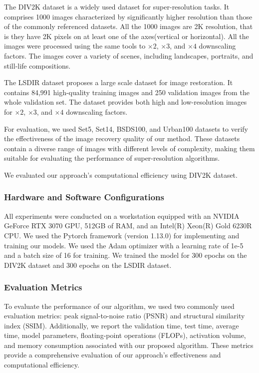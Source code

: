 \documentclass[10pt,twocolumn,letterpaper]{article}
\begin{document}
The DIV2K dataset is a widely used dataset for super-resolution tasks. It comprises 1000 images characterized by significantly higher resolution than those of the commonly referenced datasets. All the 1000 images are 2K resolution, that is they have 2K pixels on at least one of the axes(vertical or horizontal). All the images were processed using the same tools to $\times2$, $\times3$, and $\times4$ downscaling factors. The images cover a variety of scenes, including landscapes, portraits, and still-life compositions.

The LSDIR dataset proposes a large scale dataset for image restoration. It contains 84,991 high-quality training images and 250 validation images from the whole validation set. The dataset provides both high and low-resolution images for $\times2$, $\times3$, and $\times4$ downscaling factors.

For evaluation, we used Set5, Set14, BSDS100, and Urban100 datasets to verify the effectiveness of the image recovery quality of our method. These datasets contain a diverse range of images with different levels of complexity, making them suitable for evaluating the performance of super-resolution algorithms.

We evaluated our approach's computational efficiency using DIV2K dataset.


\subsubsection{Hardware and Software Configurations}
All experiments were conducted on a workstation equipped with an NVIDIA GeForce RTX 3070 GPU, 512GB of RAM, and an Intel(R) Xeon(R) Gold 6230R CPU. We used the Pytorch framework (version 1.13.0) for implementing and training our models. We used the Adam optimizer with a learning rate of 1e-5 and a batch size of 16 for training. We trained the model for 300 epochs on the DIV2K dataset and 300 epochs on the LSDIR dataset.

\subsubsection{Evaluation Metrics}
To evaluate the performance of our algorithm, we used two commonly used evaluation metrics: peak signal-to-noise ratio (PSNR) and structural similarity index (SSIM). Additionally, we report the validation time, test time, average time, model parameters, floating-point operations (FLOPs), activation volume, and memory consumption associated with our proposed algorithm. These metrics provide a comprehensive evaluation of our approach's effectiveness and computational efficiency.
\begin{table}[t]
  \centering
  \caption{Results of our computational efficiency on DIV2K dataset.}
  \label{tab-runtime}
\end{table}
\end{document}
